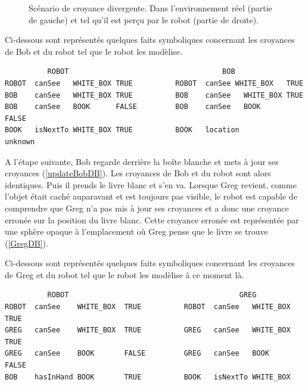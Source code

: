 \documentclass[a4paper,11pt,twoside]{StyleThese}
\begin{document}
\begin{figure}[ht!]
\begin{center}
 \end{center}
  \caption{Scénario de croyance divergente. Dans l'environnement réel (partie de gauche) et tel qu'il est perçu par le robot (partie de droite).}
  \label{divB}
\end{figure}

Ci-dessous sont représentés quelques faits symboliques concernant les croyances de Bob et du robot tel que le robot les modèlise.

\begin{scriptsize}
\begin{verbatim}
          ROBOT                                    BOB
ROBOT  canSee   WHITE_BOX TRUE          ROBOT  canSee WHITE_BOX   TRUE    
BOB    canSee   WHITE_BOX TRUE          BOB    canSee   WHITE_BOX TRUE
BOB    canSee   BOOK      FALSE         BOB    canSee   BOOK      FALSE
BOOK   isNextTo WHITE_BOX TRUE          BOOK   location           unknown
\end{verbatim}
\end{scriptsize}

A l'étape suivante, Bob regarde derrière la boîte blanche et mets à jour ses croyances (\ref{updateBobDB}). Les croyances de Bob et du robot sont alors identiques.
Puis il prends le livre blanc et s'en va. Lorsque Greg revient, comme l'objet était caché auparavant et est toujours pas visible, le robot est capable de comprendre que Greg n'a pas mis à jour ses croyances et a donc une croyance erronée sur la position du livre blanc. Cette croyance erronée est représentée par une sphère opaque à l'emplacement où Greg pense que le livre se trouve (\ref{GregDB}).

Ci-dessous sont représentés quelques faits symboliques concernant les croyances de Greg et du robot tel que le robot les modèlise à ce moment là.

\begin{scriptsize}
\begin{verbatim}
          ROBOT                                        GREG
ROBOT  canSee    WHITE_BOX  TRUE          ROBOT  canSee   WHITE_BOX   TRUE    
GREG   canSee    WHITE_BOX  TRUE          GREG   canSee   WHITE_BOX   TRUE
GREG   canSee    BOOK       FALSE         GREG   canSee   BOOK        FALSE
BOB    hasInHand BOOK       TRUE          BOOK   isNextTo WHITE_BOX
\end{verbatim}
\end{scriptsize}
\end{document}
